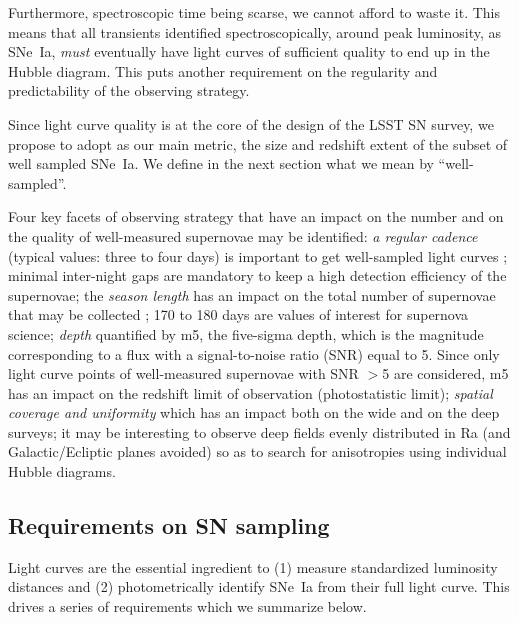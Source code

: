 \documentclass [11pt,a4paper]{article}
\begin{document}
Furthermore, spectroscopic time being scarse, we cannot afford to
waste it.  This means that all transients identified
spectroscopically, around peak luminosity, as SNe~Ia, {\em must}
eventually have light curves of sufficient quality to end up in the
Hubble diagram.  This puts another requirement on the regularity and
predictability of the observing strategy.

Since light curve quality is at the core of the design of the LSST SN
survey, we propose to adopt as our main metric, the size and redshift
extent of the subset of well sampled SNe~Ia.  We define in the next
section what we mean by ``well-sampled''.


Four key facets of observing strategy that have an impact on the number and on the quality of well-measured supernovae may be identified: {\it a regular cadence} (typical values: three to four days) is important to get well-sampled light curves ; minimal inter-night gaps are mandatory to keep a high detection efficiency of the supernovae; the {\it season length} has an impact on the total number of supernovae that may be collected ; 170 to 180 days are values of interest for supernova science; {\it depth} quantified by m5, the five-sigma depth, which is the magnitude corresponding to a flux with a signal-to-noise ratio (SNR) equal to 5. Since only light curve points of well-measured supernovae with SNR $>$5 are considered, m5 has an impact on the redshift limit of observation (photostatistic limit); {\it spatial coverage and uniformity} which has an impact both on the wide and on the deep surveys; it may be interesting to observe deep fields evenly distributed in Ra (and Galactic/Ecliptic planes avoided) so as to search for anisotropies using individual Hubble diagrams.


\subsection{Requirements on SN sampling}
\label{sec:sn_sampling_requirements}

Light curves are the essential ingredient to (1) measure standardized
luminosity distances and (2) photometrically identify SNe~Ia from
their full light curve. This drives a series of requirements which we
summarize below.
\end{document}
